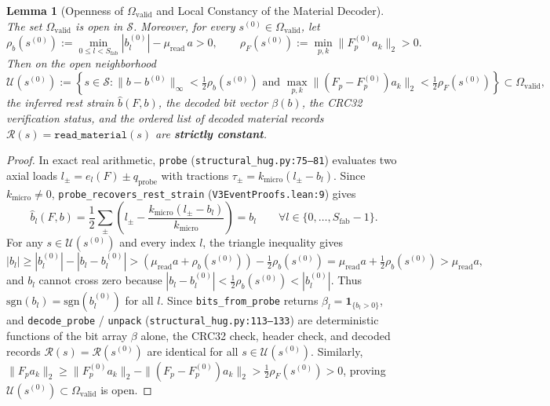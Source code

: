 \documentclass[11pt,a4paper]{article}
\newtheorem{lemma}[theorem]{Lemma}
\theoremstyle{definition}
\begin{document}
\begin{lemma}[Openness of $\Omega_{\mathrm{valid}}$ and Local Constancy of the Material Decoder]
\label{lem:decoder_const}
The set $\Omega_{\mathrm{valid}}$ is open in $\mathcal{S}$. Moreover, for every $s^{(0)} \in \Omega_{\mathrm{valid}}$, let
\begin{equation}
  \rho_b(s^{(0)}) := \min_{0 \le l < S_{\mathrm{fab}}} |b_l^{(0)}| - \mu_{\mathrm{read}}\, a > 0, \qquad
  \rho_F(s^{(0)}) := \min_{p, k} \|F_p^{(0)} a_k\|_2 > 0.
\end{equation}
Then on the open neighborhood
\begin{equation}
  \mathcal{U}(s^{(0)}) := \left\{ s \in \mathcal{S} : \|b - b^{(0)}\|_\infty < \tfrac{1}{2}\rho_b(s^{(0)}) \text{ and } \max_{p,k} \|(F_p - F_p^{(0)})a_k\|_2 < \tfrac{1}{2}\rho_F(s^{(0)}) \right\} \subset \Omega_{\mathrm{valid}},
\end{equation}
the inferred rest strain $\widehat{b}(F, b)$, the decoded bit vector $\beta(b)$, the CRC32 verification status, and the ordered list of decoded material records $\mathcal{R}(s) = \texttt{read\_material}(s)$ are \textbf{strictly constant}.
\end{lemma}

\begin{proof}
In exact real arithmetic, \texttt{probe} (\texttt{structural\_hug.py:75--81}) evaluates two axial loads $l_\pm = e_l(F) \pm q_{\mathrm{probe}}$ with tractions $\tau_\pm = k_{\mathrm{micro}}(l_\pm - b_l)$. Since $k_{\mathrm{micro}} \ne 0$, \texttt{probe\_recovers\_rest\_strain} (\texttt{V3EventProofs.lean:9}) gives
\begin{equation}
  \widehat{b}_l(F, b) = \frac{1}{2}\sum_{\pm}\left(l_\pm - \frac{k_{\mathrm{micro}}(l_\pm - b_l)}{k_{\mathrm{micro}}}\right) = b_l \qquad \forall l \in \{0, \dots, S_{\mathrm{fab}}-1\}.
\end{equation}
For any $s \in \mathcal{U}(s^{(0)})$ and every index $l$, the triangle inequality gives
\begin{equation}
  |b_l| \ge |b_l^{(0)}| - |b_l - b_l^{(0)}| > (\mu_{\mathrm{read}}a + \rho_b(s^{(0)})) - \tfrac{1}{2}\rho_b(s^{(0)}) = \mu_{\mathrm{read}}a + \tfrac{1}{2}\rho_b(s^{(0)}) > \mu_{\mathrm{read}}a,
\end{equation}
and $b_l$ cannot cross zero because $|b_l - b_l^{(0)}| < \frac{1}{2}\rho_b(s^{(0)}) < |b_l^{(0)}|$. Thus $\mathrm{sgn}(b_l) = \mathrm{sgn}(b_l^{(0)})$ for all $l$. Since \texttt{bits\_from\_probe} returns $\beta_l = \mathbf{1}_{\{b_l > 0\}}$, and \texttt{decode\_probe} / \texttt{unpack} (\texttt{structural\_hug.py:113--133}) are deterministic functions of the bit array $\beta$ alone, the CRC32 check, header check, and decoded records $\mathcal{R}(s) = \mathcal{R}(s^{(0)})$ are identical for all $s \in \mathcal{U}(s^{(0)})$. Similarly, $\|F_p a_k\|_2 \ge \|F_p^{(0)} a_k\|_2 - \|(F_p - F_p^{(0)})a_k\|_2 > \frac{1}{2}\rho_F(s^{(0)}) > 0$, proving $\mathcal{U}(s^{(0)}) \subset \Omega_{\mathrm{valid}}$ is open.
\end{proof}
\end{document}
